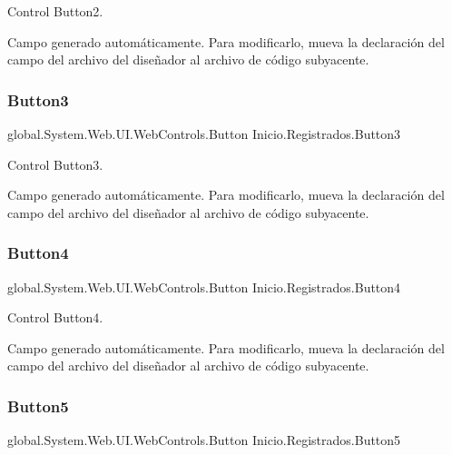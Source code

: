 Control Button2. 

Campo generado automáticamente. Para modificarlo, mueva la declaración del campo del archivo del diseñador al archivo de código subyacente. \mbox{\label{classInicio_1_1Registrados_ac3990a81617665a0ef39beeb50d83806}} 
\subsubsection{\texorpdfstring{Button3}{Button3}}
{\footnotesize\ttfamily global.\+System.\+Web.\+U\+I.\+Web\+Controls.\+Button Inicio.\+Registrados.\+Button3\hspace{0.3cm}{\ttfamily [protected]}}



Control Button3. 

Campo generado automáticamente. Para modificarlo, mueva la declaración del campo del archivo del diseñador al archivo de código subyacente. \mbox{\label{classInicio_1_1Registrados_a17ce0318c403c057f81a1d740673a57f}} 
\subsubsection{\texorpdfstring{Button4}{Button4}}
{\footnotesize\ttfamily global.\+System.\+Web.\+U\+I.\+Web\+Controls.\+Button Inicio.\+Registrados.\+Button4\hspace{0.3cm}{\ttfamily [protected]}}



Control Button4. 

Campo generado automáticamente. Para modificarlo, mueva la declaración del campo del archivo del diseñador al archivo de código subyacente. \mbox{\label{classInicio_1_1Registrados_a07302395de09db810ad8f7f096762449}} 
\subsubsection{\texorpdfstring{Button5}{Button5}}
{\footnotesize\ttfamily global.\+System.\+Web.\+U\+I.\+Web\+Controls.\+Button Inicio.\+Registrados.\+Button5\hspace{0.3cm}{\ttfamily [protected]}}



